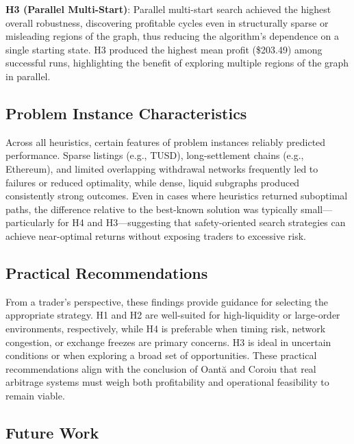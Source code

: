 \documentclass[11pt]{article}
\begin{document}
\textbf{H3 (Parallel Multi-Start)}: Parallel multi-start search achieved the highest overall robustness, discovering profitable cycles even in structurally sparse or misleading regions of the graph, thus reducing the algorithm's dependence on a single starting state. H3 produced the highest mean profit (\$203.49) among successful runs, highlighting the benefit of exploring multiple regions of the graph in parallel.

\subsection{Problem Instance Characteristics}

Across all heuristics, certain features of problem instances reliably predicted performance. Sparse listings (e.g., TUSD), long-settlement chains (e.g., Ethereum), and limited overlapping withdrawal networks frequently led to failures or reduced optimality, while dense, liquid subgraphs produced consistently strong outcomes. Even in cases where heuristics returned suboptimal paths, the difference relative to the best-known solution was typically small---particularly for H4 and H3---suggesting that safety-oriented search strategies can achieve near-optimal returns without exposing traders to excessive risk.

\subsection{Practical Recommendations}

From a trader's perspective, these findings provide guidance for selecting the appropriate strategy. H1 and H2 are well-suited for high-liquidity or large-order environments, respectively, while H4 is preferable when timing risk, network congestion, or exchange freezes are primary concerns. H3 is ideal in uncertain conditions or when exploring a broad set of opportunities. These practical recommendations align with the conclusion of Oantă and Coroiu \cite{oanta2023arbitrage} that real arbitrage systems must weigh both profitability and operational feasibility to remain viable.

\subsection{Future Work}
\end{document}
